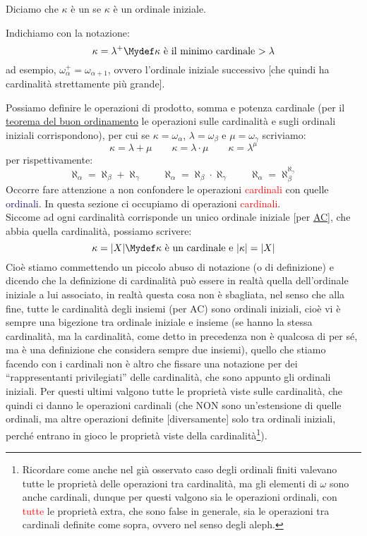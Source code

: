 \documentclass[11pt]{scrartcl}
\begin{document}
\begin{definition}[Cardinali]
	Diciamo che $\kappa$ è un  se $\kappa$ è un ordinale iniziale.
\end{definition}

\begin{notation}
	Indichiamo con la notazione:
	\[ \kappa = \lambda^+ \Mydef \text{$\kappa$ è il minimo cardinale $>\lambda$}
		\]
	ad esempio, $\omega_\alpha^+ = \omega_{\alpha + 1}$, ovvero l'ordinale iniziale successivo [che quindi ha cardinalità strettamente più grande].
\end{notation}

Possiamo definire le operazioni di prodotto, somma e potenza cardinale (per il \hyperref[buon_ordinamento]{teorema del buon ordinamento} le operazioni sulle cardinalità e sugli ordinali iniziali corrispondono), per cui se $\kappa = \omega_\alpha$, $\lambda = \omega_\beta$ e $\mu = \omega_\gamma$ scriviamo:
\[ \kappa =  \lambda + \mu \qquad \kappa = \lambda \cdot \mu \qquad \kappa = \lambda^\mu
	\]
per rispettivamente:
\[ \aleph_\alpha = \aleph_\beta + \aleph_\gamma \qquad \aleph_\alpha = \aleph_\beta \cdot \aleph_\gamma \qquad \aleph_\alpha = \aleph_\beta^{\aleph_\gamma}
	\]
Occorre fare attenzione a non confondere le operazioni \textcolor{red}{cardinali} con quelle \textcolor{MidnightBlue}{ordinali}. In questa sezione ci occupiamo di operazioni \textcolor{red}{cardinali}.\\
Siccome ad ogni cardinalità corrisponde un unico ordinale iniziale [per \hyperref[ax9]{AC}], che abbia quella cardinalità, possiamo scrivere:
\[ \kappa = |X| \Mydef \text{$\kappa$ è un cardinale e $|\kappa| = |X|$}
	\]
Cioè stiamo commettendo un piccolo abuso di notazione (o di definizione) e dicendo che la definizione di cardinalità può essere in realtà quella dell'ordinale iniziale a lui associato, in realtà questa cosa non è sbagliata, nel senso che alla fine, tutte le cardinalità degli insiemi (per AC) sono ordinali iniziali, cioè vi è sempre una bigezione tra ordinale iniziale e insieme (se hanno la stessa cardinalità, ma la cardinalità, come detto in precedenza non è qualcosa di per sé, ma è una definizione che 
considera sempre due insiemi), quello che stiamo facendo con i cardinali non è altro che fissare una notazione per dei ``rappresentanti privilegiati'' delle cardinalità, che sono appunto gli ordinali iniziali. Per questi ultimi valgono tutte le proprietà viste sulle cardinalità, che quindi ci danno le operazioni cardinali (che NON sono un'estensione di quelle ordinali, ma altre operazioni definite [diversamente] solo tra ordinali iniziali, perché entrano in gioco le proprietà viste della cardinalità\footnote{Ricordare come anche nel già osservato caso 
degli ordinali finiti valevano tutte le proprietà delle operazioni tra cardinalità, ma gli elementi di $\omega$ sono anche cardinali, dunque per questi valgono sia le operazioni ordinali, con \textcolor{red}{tutte} le proprietà extra, che sono false in generale, sia le operazioni tra cardinali definite come sopra, ovvero nel senso degli aleph.}).
\end{document}
